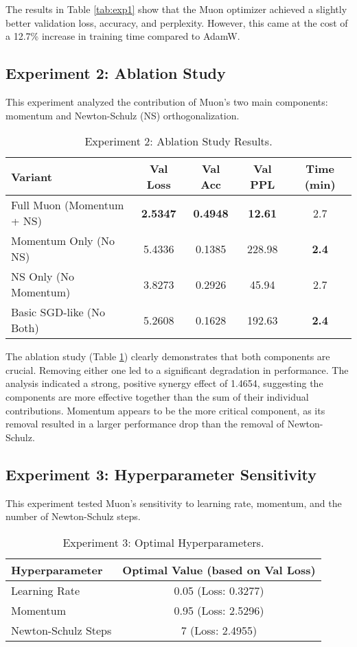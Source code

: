 \documentclass[11pt, a4paper]{article}
\begin{document}
The results in Table \ref{tab:exp1} show that the Muon optimizer achieved a slightly better validation loss, accuracy, and perplexity. However, this came at the cost of a 12.7\% increase in training time compared to AdamW.

\subsection{Experiment 2: Ablation Study}
This experiment analyzed the contribution of Muon's two main components: momentum and Newton-Schulz (NS) orthogonalization.

\begin{table}[h!]
\centering
\caption{Experiment 2: Ablation Study Results.}
\label{tab:exp2}
\begin{tabular}{@{}lcccc@{}}
\toprule
Variant & Val Loss & Val Acc & Val PPL & Time (min) \\ \midrule
Full Muon (Momentum + NS) & \textbf{2.5347} & \textbf{0.4948} & \textbf{12.61} & 2.7 \\
Momentum Only (No NS) & 5.4336 & 0.1385 & 228.98 & \textbf{2.4} \\
NS Only (No Momentum) & 3.8273 & 0.2926 & 45.94 & 2.7 \\
Basic SGD-like (No Both) & 5.2608 & 0.1628 & 192.63 & \textbf{2.4} \\ \bottomrule
\end{tabular}
\end{table}

The ablation study (Table \ref{tab:exp2}) clearly demonstrates that both components are crucial. Removing either one led to a significant degradation in performance. The analysis indicated a strong, positive synergy effect of 1.4654, suggesting the components are more effective together than the sum of their individual contributions. Momentum appears to be the more critical component, as its removal resulted in a larger performance drop than the removal of Newton-Schulz.

\subsection{Experiment 3: Hyperparameter Sensitivity}
This experiment tested Muon's sensitivity to learning rate, momentum, and the number of Newton-Schulz steps.

\begin{table}[h!]
\centering
\caption{Experiment 3: Optimal Hyperparameters.}
\label{tab:exp3}
\begin{tabular}{@{}lc@{}}
\toprule
Hyperparameter & Optimal Value (based on Val Loss) \\ \midrule
Learning Rate & 0.05 (Loss: 0.3277) \\
Momentum & 0.95 (Loss: 2.5296) \\
Newton-Schulz Steps & 7 (Loss: 2.4955) \\ \bottomrule
\end{tabular}
\end{table}
\end{document}
